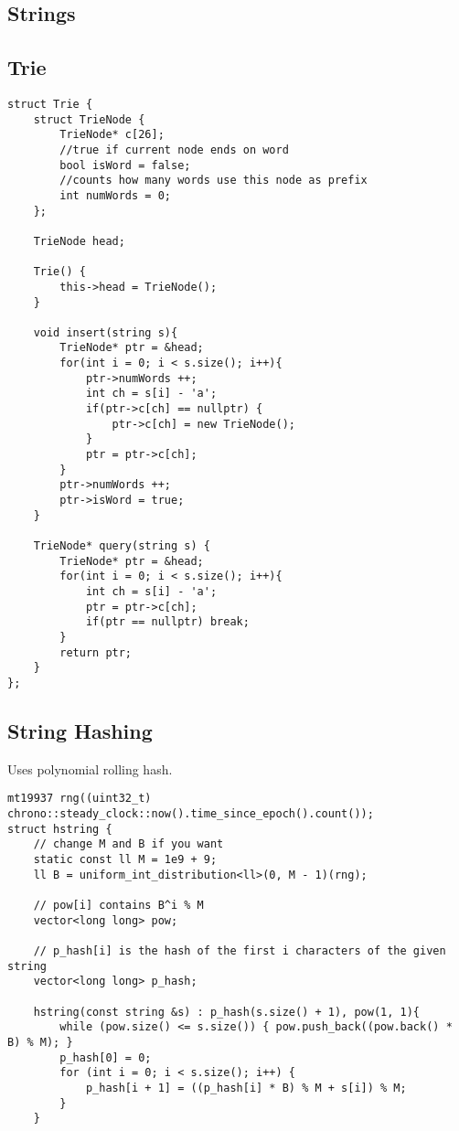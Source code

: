 \documentclass[8pt, headheight=10pt, a4paper]{article}
\begin{document}
\begin{multicols*}{3}
\section{Strings}
\subsection{Trie}
\begin{lstlisting}
struct Trie {
    struct TrieNode {
        TrieNode* c[26];
        //true if current node ends on word
        bool isWord = false;
        //counts how many words use this node as prefix
        int numWords = 0;   
    };

    TrieNode head;

    Trie() {
        this->head = TrieNode();
    }

    void insert(string s){
        TrieNode* ptr = &head;
        for(int i = 0; i < s.size(); i++){
            ptr->numWords ++;
            int ch = s[i] - 'a';
            if(ptr->c[ch] == nullptr) {
                ptr->c[ch] = new TrieNode();
            }
            ptr = ptr->c[ch];
        }
        ptr->numWords ++;
        ptr->isWord = true;
    }

    TrieNode* query(string s) {
        TrieNode* ptr = &head;
        for(int i = 0; i < s.size(); i++){
            int ch = s[i] - 'a';
            ptr = ptr->c[ch];
            if(ptr == nullptr) break;
        }
        return ptr;
    }
};
\end{lstlisting}

\subsection{String Hashing}
Uses polynomial rolling hash. 
\begin{lstlisting}
mt19937 rng((uint32_t) chrono::steady_clock::now().time_since_epoch().count());
struct hstring {
	// change M and B if you want
	static const ll M = 1e9 + 9;
	ll B = uniform_int_distribution<ll>(0, M - 1)(rng);

	// pow[i] contains B^i % M
	vector<long long> pow;

	// p_hash[i] is the hash of the first i characters of the given string
	vector<long long> p_hash;

	hstring(const string &s) : p_hash(s.size() + 1), pow(1, 1){
		while (pow.size() <= s.size()) { pow.push_back((pow.back() * B) % M); }
		p_hash[0] = 0;
		for (int i = 0; i < s.size(); i++) {
			p_hash[i + 1] = ((p_hash[i] * B) % M + s[i]) % M;
		}
	}


\end{lstlisting}
\end{multicols*}
\end{document}
